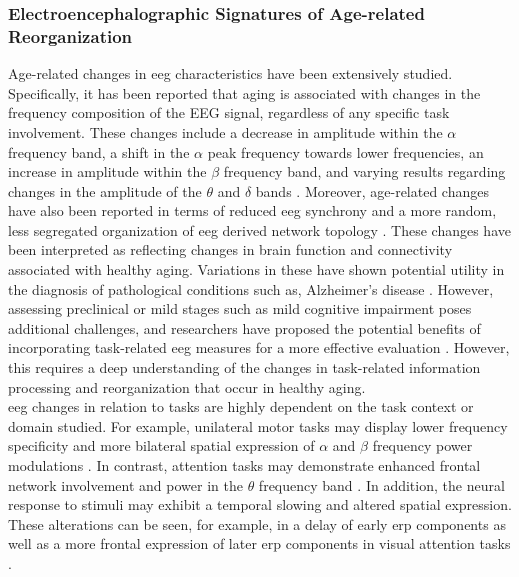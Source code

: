 \subsubsection{Electroencephalographic Signatures of Age-related Reorganization}
Age-related changes in \gls{eeg} characteristics have been extensively studied. Specifically, it has been reported that aging is associated with changes in the frequency composition of the EEG signal, regardless of any specific task involvement. These changes include a decrease in amplitude within the $\alpha$ frequency band, a shift in the $\alpha$ peak frequency towards lower frequencies, an increase in amplitude within the $\beta$ frequency band, and varying results regarding changes in the amplitude of the $\theta$ and $\delta$ bands \cite{Rossini2007, Ishii2017, Courtney2021}. Moreover, age-related changes have also been reported in terms of reduced \gls{eeg} synchrony and a more random, less segregated organization of \gls{eeg} derived network topology \cite{Smit2012, Samogin2022}. These changes have been interpreted as reflecting changes in brain function and connectivity associated with healthy aging. Variations in these have shown potential utility in the diagnosis of pathological conditions such as, Alzheimer's disease \cite{Babiloni2021}. However, assessing preclinical or mild stages such as mild cognitive impairment poses additional challenges, and researchers have proposed the potential benefits of incorporating task-related \gls{eeg} measures for a more effective evaluation \cite{Froehlich2021, Farina2020}. However, this requires a deep understanding of the changes in task-related information processing and reorganization that occur in healthy aging.\\
\Gls{eeg} changes in relation to tasks are highly dependent on the task context or domain studied. For example, unilateral motor tasks may display lower frequency specificity and more bilateral spatial expression of $\alpha$ and $\beta$ frequency power modulations \cite{Quandt2016}. In contrast, attention tasks may demonstrate enhanced frontal network involvement and power in the $\theta$ frequency band \cite{Hong2016}. In addition, the neural response to stimuli may exhibit a temporal slowing and altered spatial expression. These alterations can be seen, for example, in a delay of early \gls{erp} components as well as a more frontal expression of later \gls{erp} components in visual attention tasks \cite{Li2013, Reuter2017}.\\
